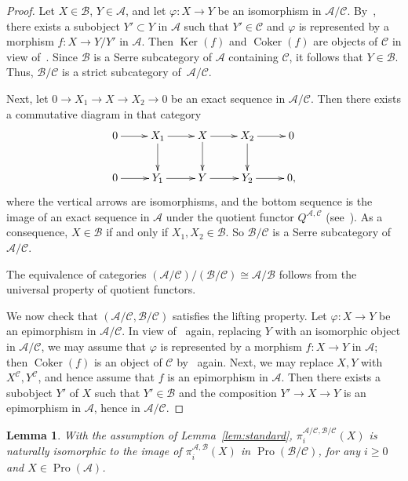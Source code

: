 \documentclass[11pt]{article}
\newtheorem{lemm}[theo]{Lemma}
\theoremstyle{definition}
\numberwithin{equation}{section}
\newcommand\cA{{\mathcal A}}
\newcommand\cB{{\mathcal B}}
\newcommand\cC{{\mathcal C}}
\DeclareMathOperator{\Coker}{Coker}
\DeclareMathOperator{\Ker}{Ker}
\DeclareMathOperator{\Pro}{Pro}
\theoremstyle{remark}
\begin{document}
\begin{proof}
Let $X \in \cB$, $Y \in \cA$, and let $\varphi : X \to Y$ be an isomorphism in $\cA/\cC$. By~\cite[Lem.~2.7]{Br17b}, there exists a subobject $Y' \subset Y$ in $\cA$ such that $Y' \in \cC$ and $\varphi$ is represented by a morphism $f: X \to Y/Y'$ in $\cA$. Then $\Ker(f)$ and $\Coker(f)$ are objects of $\cC$ in view of~\cite[III.1.Lem.~2]{Gabriel}. Since $\cB$ is a Serre subcategory of $\cA$ containing $\cC$, it follows that $Y \in \cB$. Thus, $\cB/\cC$ is a strict subcategory of~$\cA/\cC$.

Next, let $0 \to X_1 \to X \to X_2 \to 0$ be an exact sequence in $\cA/\cC$. Then there exists a commutative diagram in that category
\[
\xymatrix{ 0 \ar[r] & X_1 \ar[r] \ar[d] & X \ar[r] \ar[d] & X_2 \ar[r] \ar[d] & 0 \\
0 \ar[r] & Y_1 \ar[r] & Y \ar[r] & Y_2 \ar[r] & 0, \\
}
\]
where the vertical arrows are isomorphisms, and the bottom sequence is the image of an exact sequence in $\cA$ under the quotient functor $Q^{\cA,\cC}$ (see~\cite[Lem.~2.9]{Br17b}). As a consequence, $X \in \cB$ if and only if $X_1,X_2 \in \cB$. So $\cB/\cC$ is a Serre subcategory of $\cA/\cC$.

The equivalence of categories $(\cA/\cC)/(\cB/\cC) \cong \cA/\cB$ follows from the universal property of quotient functors.

We now check that $(\cA/\cC,\cB/\cC)$ satisfies the lifting property. Let $\varphi : X \to Y$ be an epimorphism in $\cA/\cC$. In view of~\cite[Lem.~2.7]{Br17b} again, replacing $Y$ with an isomorphic object in $\cA/\cC$, we may assume that $\varphi$ is represented by a morphism $f: X \to Y$ in $\cA$; then $\Coker(f)$ is an object of $\cC$ by~\cite[III.1.Lem.~2]{Gabriel} again. Next, we may replace $X,Y$ with $X^{\cC}, Y^{\cC}$, and hence assume that $f$ is an epimorphism in $\cA$. Then there exists a subobject $Y'$ of $X$ such that $Y' \in \cB$ and the composition $Y' \to X \to Y$ is an epimorphism in $\cA$, hence in $\cA/\cC$.
\end{proof}

\begin{lemm}\label{lem:compatible}
With the assumption of Lemma~\ref{lem:standard}, $\pi_i^{\cA/\cC,\cB/\cC}(X)$ is naturally isomorphic to the image of $\pi_i^{\cA, \cB}(X)$ in $\Pro(\cB/\cC)$, for any $i \geq 0$ and $X \in \Pro(\cA)$.
\end{lemm}
\end{document}
